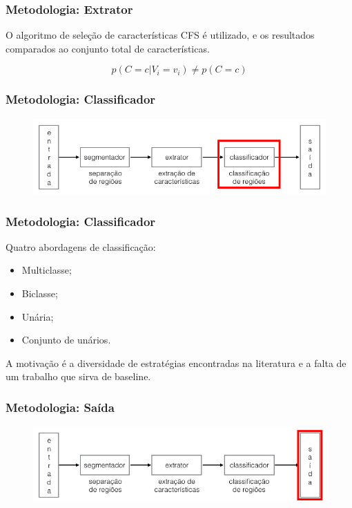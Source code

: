 \documentclass[t]{beamer}
\begin{document}
\begin{frame}[c]

	\frametitle{Metodologia: Extrator}

	O algoritmo de seleção de características CFS é utilizado, e os resultados comparados ao conjunto total de características.

	\vspace{0.5cm}

	\begin{equation*}
		\displaystyle p(C=c|V_i=v_i) \neq p(C=c)
	\end{equation*}
\end{frame}

\begin{frame}[c]
	\frametitle{Metodologia: Classificador}
	\begin{figure}[h]
    	\includegraphics[width=\textwidth]{imgs/arquitetura_4}
	\end{figure}
\end{frame}

\begin{frame}[c]
	\frametitle{Metodologia: Classificador}
	
	Quatro abordagens de classificação:
	\begin{itemize}
		\item Multiclasse;
		\item Biclasse;
		\item Unária;
		\item Conjunto de unários.
	\end{itemize}

	\vspace{0.5cm}

	A motivação é a diversidade de estratégias encontradas na literatura e a falta de um trabalho que sirva de baseline.
\end{frame}

\begin{frame}[c]
	\frametitle{Metodologia: Saída}
	\begin{figure}[h]
    	\includegraphics[width=\textwidth]{imgs/arquitetura_5}
	\end{figure}
\end{frame}
\end{document}
